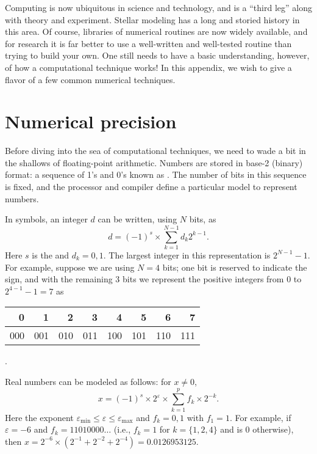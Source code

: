 
Computing is now ubiquitous in science and technology, and is a ``third leg'' along with theory and experiment. Stellar modeling has a long and storied history in this area. Of course, libraries of numerical routines are now widely available, and for research it is far better to use a well-written and well-tested routine than trying to build your own. One still needs to have a basic understanding, however, of how a computational technique works! In this appendix, we wish to give a flavor of a few common numerical techniques. 

\section{Numerical precision}\label{s.numerical-precision}
Before diving into the sea of computational techniques, we need to wade a bit in the shallows of floating-point arithmetic. Numbers are stored in base-2 (binary) format: a sequence of 1's and 0's known as . The number of bits in this sequence is fixed, and the processor and compiler define a particular model to represent numbers.

In symbols, an integer $d$ can be written, using $N$ bits, as
\[
d = (-1)^{s}\times\sum_{k=1}^{N-1} d_{k}2^{k-1}.
\]
Here $s$ is the  and $d_{k} = 0,1$. The largest integer in this representation is $2^{N-1}-1$. For example, suppose we are using $N=4$ bits; one bit is reserved to indicate the sign, and with the remaining 3 bits we represent the positive integers from $0$ to $2^{4-1}-1 = 7$ as
\begin{tabular}{rrrrrrrr}
0 & 1 & 2 & 3 & 4 & 5 & 6 & 7\\
\hline
000 & 001 & 010 & 011 & 100 & 101 & 110 & 111
\end{tabular}.

Real numbers can be modeled
as follows: for $x \neq 0$, 
\begin{equation}\label{e.modal-reals}
x = (-1)^{s}\times 2^{\varepsilon}\times \sum_{k=1}^{p} f_{k}\times 2^{-k}.
\end{equation}
Here the exponent $\varepsilon_{\min}\le\varepsilon\le\varepsilon_{\max}$ and $f_{k}=0,1$ with $f_{1} = 1$. For example, if $\varepsilon=-6$ and $f_{k} = 11010000\ldots$ (i.e., $f_{k}=1$ for $k=\{1,2,4\}$ and is 0 otherwise), then
$x = 2^{-6}\times (2^{-1}+2^{-2}+2^{-4}) = 0.0126953125$.

